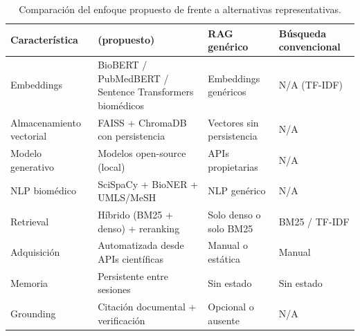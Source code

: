 
\begin{table}[!t]
\centering
\caption{Comparación del enfoque propuesto de \sirca{} frente a alternativas representativas.}
\label{tab:comparison}
\renewcommand{\arraystretch}{1.2}
\footnotesize
\begin{tabularx}{\textwidth}{l X X X}
\toprule
\textbf{Característica} & \textbf{\sirca{} (propuesto)} & \textbf{RAG genérico} & \textbf{Búsqueda convencional} \\
\midrule
Embeddings      & BioBERT / PubMedBERT / Sentence Transformers biomédicos & Embeddings genéricos & N/A (TF-IDF) \\
\addlinespace
Almacenamiento vectorial & FAISS + ChromaDB con persistencia & Vectores sin persistencia & N/A \\
\addlinespace
Modelo generativo & Modelos open-source (local) & APIs propietarias & N/A \\
\addlinespace
NLP biomédico   & SciSpaCy + BioNER + UMLS/MeSH & NLP genérico & N/A \\
\addlinespace
Retrieval       & Híbrido (BM25 + denso) + reranking & Solo denso o solo BM25 & BM25 / TF-IDF \\
\addlinespace
Adquisición     & Automatizada desde APIs científicas & Manual o estática & Manual \\
\addlinespace
Memoria         & Persistente entre sesiones & Sin estado & Sin estado \\
\addlinespace
Grounding       & Citación documental + verificación & Opcional o ausente & N/A \\
\bottomrule
\end{tabularx}
\end{table}
